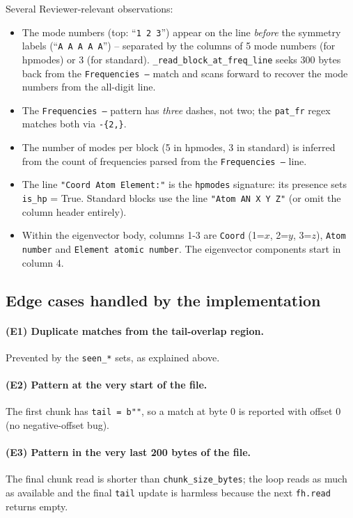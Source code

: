 \documentclass[10pt,a4paper,twoside]{article}
\newcommand{\fn}[1]{\texttt{#1}}
\begin{document}
Several Reviewer-relevant observations:
\begin{itemize}
  \item The mode numbers (top: ``\texttt{1   2   3}'') appear on the
        line \emph{before} the symmetry labels (``\texttt{A A A A
        A}'') -- separated by the columns of 5 mode numbers (for
        hpmodes) or 3 (for standard). \fn{\_read\_block\_at\_freq\_line}
        seeks 300 bytes back from the \texttt{Frequencies ---} match
        and scans forward to recover the mode numbers from the
        all-digit line.
  \item The \texttt{Frequencies ---} pattern has \emph{three} dashes,
        not two; the \texttt{pat\_fr} regex matches both via
        \texttt{-\{2,\}}.
  \item The number of modes per block (5 in hpmodes, 3 in standard)
        is inferred from the count of frequencies parsed from the
        \texttt{Frequencies ---} line.
  \item The line \texttt{"Coord Atom Element:"} is the
        \texttt{hpmodes} signature: its presence sets \fn{is\_hp} = True.
        Standard blocks use the line \texttt{"Atom AN  X  Y  Z"} (or
        omit the column header entirely).
  \item Within the eigenvector body, columns 1-3 are
        \texttt{Coord} (1=$x$, 2=$y$, 3=$z$), \texttt{Atom number} and
        \texttt{Element atomic number}. The eigenvector components
        start in column 4.
\end{itemize}

\subsection{Edge cases handled by the implementation}
\label{sec:scan-edge-cases}

\paragraph{(E1) Duplicate matches from the tail-overlap region.}
Prevented by the \texttt{seen\_*} sets, as explained above.

\paragraph{(E2) Pattern at the very start of the file.}
The first chunk has \texttt{tail = b""}, so a match at byte 0 is
reported with offset 0 (no negative-offset bug).

\paragraph{(E3) Pattern in the very last 200 bytes of the file.}
The final chunk read is shorter than \texttt{chunk\_size\_bytes};
the loop reads as much as available and the final \texttt{tail}
update is harmless because the next \texttt{fh.read} returns
empty.
\end{document}
